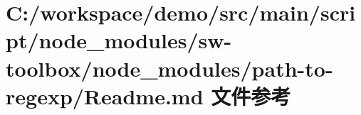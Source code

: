 \hypertarget{node__modules_2sw-toolbox_2node__modules_2path-to-regexp_2_r_e_a_d_m_e_8md}{}\section{C\+:/workspace/demo/src/main/script/node\+\_\+modules/sw-\/toolbox/node\+\_\+modules/path-\/to-\/regexp/\+Readme.md 文件参考}
\label{node__modules_2sw-toolbox_2node__modules_2path-to-regexp_2_r_e_a_d_m_e_8md}
